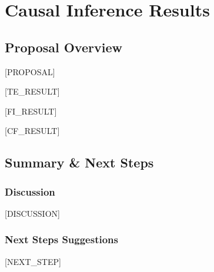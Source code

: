 \section{Causal Inference Results}
\subsection{Proposal Overview}
[PROPOSAL]

[TE_RESULT]

[FI_RESULT]

[CF_RESULT]

\subsection{Summary \& Next Steps}
\subsubsection{Discussion}

[DISCUSSION]


\subsubsection{Next Steps Suggestions}

[NEXT_STEP]
